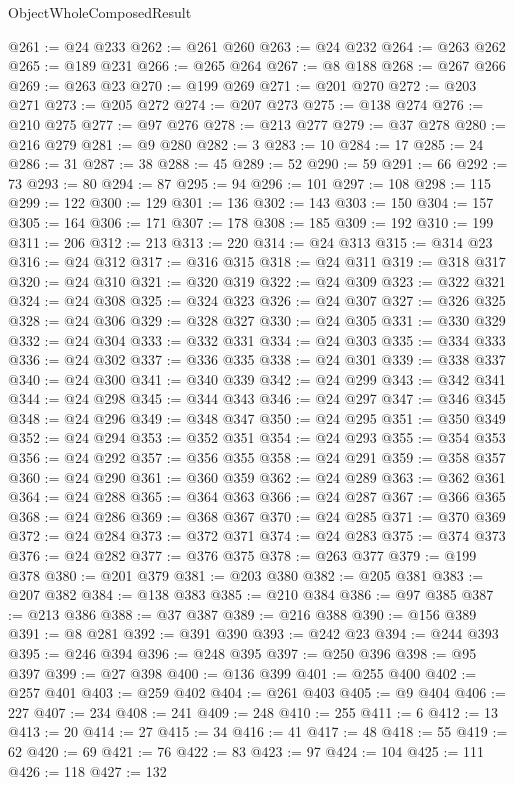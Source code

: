 \begin{lexlean}{ObjectWholeComposedResult}
\begin{coremodule}
@261 := @24 @233
@262 := @261 @260
@263 := @24 @232
@264 := @263 @262
@265 := @189 @231
@266 := @265 @264
@267 := @8 @188
@268 := @267 @266
@269 := @263 @23
@270 := @199 @269
@271 := @201 @270
@272 := @203 @271
@273 := @205 @272
@274 := @207 @273
@275 := @138 @274
@276 := @210 @275
@277 := @97 @276
@278 := @213 @277
@279 := @37 @278
@280 := @216 @279
@281 := @9 @280
@282 := 3
@283 := 10
@284 := 17
@285 := 24
@286 := 31
@287 := 38
@288 := 45
@289 := 52
@290 := 59
@291 := 66
@292 := 73
@293 := 80
@294 := 87
@295 := 94
@296 := 101
@297 := 108
@298 := 115
@299 := 122
@300 := 129
@301 := 136
@302 := 143
@303 := 150
@304 := 157
@305 := 164
@306 := 171
@307 := 178
@308 := 185
@309 := 192
@310 := 199
@311 := 206
@312 := 213
@313 := 220
@314 := @24 @313
@315 := @314 @23
@316 := @24 @312
@317 := @316 @315
@318 := @24 @311
@319 := @318 @317
@320 := @24 @310
@321 := @320 @319
@322 := @24 @309
@323 := @322 @321
@324 := @24 @308
@325 := @324 @323
@326 := @24 @307
@327 := @326 @325
@328 := @24 @306
@329 := @328 @327
@330 := @24 @305
@331 := @330 @329
@332 := @24 @304
@333 := @332 @331
@334 := @24 @303
@335 := @334 @333
@336 := @24 @302
@337 := @336 @335
@338 := @24 @301
@339 := @338 @337
@340 := @24 @300
@341 := @340 @339
@342 := @24 @299
@343 := @342 @341
@344 := @24 @298
@345 := @344 @343
@346 := @24 @297
@347 := @346 @345
@348 := @24 @296
@349 := @348 @347
@350 := @24 @295
@351 := @350 @349
@352 := @24 @294
@353 := @352 @351
@354 := @24 @293
@355 := @354 @353
@356 := @24 @292
@357 := @356 @355
@358 := @24 @291
@359 := @358 @357
@360 := @24 @290
@361 := @360 @359
@362 := @24 @289
@363 := @362 @361
@364 := @24 @288
@365 := @364 @363
@366 := @24 @287
@367 := @366 @365
@368 := @24 @286
@369 := @368 @367
@370 := @24 @285
@371 := @370 @369
@372 := @24 @284
@373 := @372 @371
@374 := @24 @283
@375 := @374 @373
@376 := @24 @282
@377 := @376 @375
@378 := @263 @377
@379 := @199 @378
@380 := @201 @379
@381 := @203 @380
@382 := @205 @381
@383 := @207 @382
@384 := @138 @383
@385 := @210 @384
@386 := @97 @385
@387 := @213 @386
@388 := @37 @387
@389 := @216 @388
@390 := @156 @389
@391 := @8 @281
@392 := @391 @390
@393 := @242 @23
@394 := @244 @393
@395 := @246 @394
@396 := @248 @395
@397 := @250 @396
@398 := @95 @397
@399 := @27 @398
@400 := @136 @399
@401 := @255 @400
@402 := @257 @401
@403 := @259 @402
@404 := @261 @403
@405 := @9 @404
@406 := 227
@407 := 234
@408 := 241
@409 := 248
@410 := 255
@411 := 6
@412 := 13
@413 := 20
@414 := 27
@415 := 34
@416 := 41
@417 := 48
@418 := 55
@419 := 62
@420 := 69
@421 := 76
@422 := 83
@423 := 97
@424 := 104
@425 := 111
@426 := 118
@427 := 132

\end{coremodule}
\end{lexlean}
